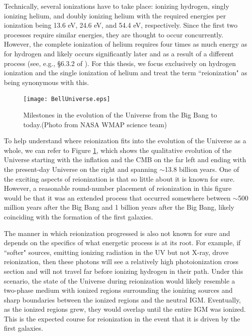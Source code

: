 Technically, several ionizations have to take place: ionizing hydrogen, singly ionizing helium, and doubly ionizing helium with the required energies per ionization being 13.6 eV, 24.6 eV, and 54.4 eV, respectively. Since the first two processes require similar energies, they are thought to occur concurrently. However, the complete ionization of helium requires four times as much energy as for hydrogen and likely occurs significantly later and as a result of a different process (see, e.g., \S 6.3.2 of \citealt{barkana2001beginning}). For this thesis, we focus exclusively on hydrogen ionization and the single ionization of helium and treat the term ``reionization" as being synonymous with this. 


\begin{figure}[h]
  \centering
  \texttt{[image: BellUniverse.eps]}
  \caption{Milestones in the evolution of the Universe from the Big Bang to today.(Photo from NASA WMAP science team)}
  \label{fig:NASAWMAP}
\end{figure}


To help understand where reionization fits into the evolution of the Universe as a whole, we can refer to Figure \ref{fig:NASAWMAP}, which shows the qualitative evolution of the Universe starting with the inflation and the CMB on the far left and ending with the present-day Universe on the right and spanning $\sim$13.8 billion years. One of the exciting aspects of reionization is that so little about it is known for sure. However, a reasonable round-number placement of reionization in this figure would be that it was an extended process that occurred somewhere between $\sim$500 million years after the Big Bang and 1 billion years after the Big Bang, likely coinciding with the formation of the first galaxies. 


The manner in which reionization progressed is also not known for sure and depends on the specifics of what energetic process is at its root. For example, if ``softer" sources, emitting ionizing radiation in the UV but not X-ray, drove reionization, then these photons will see a relatively high photoionization cross section and will not travel far before ionizing hydrogen in their path. Under this scenario, the state of the Universe during reionization would likely resemble a two-phase medium with ionized regions surrounding the ionizing sources and sharp boundaries between the ionized regions and the neutral IGM. Eventually, as the ionized regions grew, they would overlap until the entire IGM was ionized. This is the expected course for reionization in the event that it is driven by the first galaxies.	


